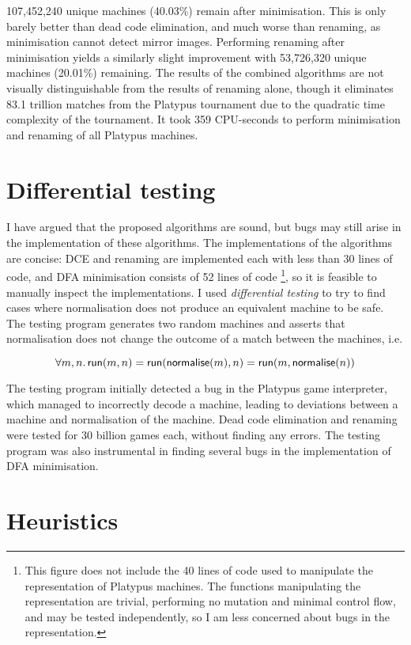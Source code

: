 107,452,240 unique machines (40.03\%) remain after minimisation.
This is only barely better than dead code elimination, and much
worse than renaming, as minimisation cannot detect mirror images.
Performing renaming after minimisation yields a similarly slight
improvement with 53,726,320 unique machines (20.01\%) remaining. The
results of the combined algorithms are not visually distinguishable from
the results of renaming alone, though it eliminates 83.1 trillion matches
from the Platypus tournament due to the quadratic time complexity of
the tournament. It took 359 CPU-seconds to perform minimisation and
renaming of all Platypus machines.

\section{Differential testing}

I have argued that the proposed algorithms are sound, but bugs may still arise
in the implementation of these algorithms. The implementations of the
algorithms are concise: DCE and renaming are implemented each with
less than 30 lines of code, and DFA minimisation consists of 52 lines of code%
\footnote{This figure does not include the 40 lines of code used to manipulate
  the representation of Platypus machines. The functions manipulating the
  representation are trivial, performing no mutation and minimal
  control flow, and may be tested independently, so I am less concerned about
  bugs in the representation.}, so it is feasible to manually inspect the
implementations. I used \emph{differential testing} to try to find cases where
normalisation does not produce an equivalent machine to be safe. The testing
program generates two random machines and asserts that normalisation
does not change the outcome of a match between the machines, i.e.

$$\forall m, n\ldotp \mathsf{run}(m, n) = \mathsf{run}(\mathsf{normalise}(m), n) = \mathsf{run}(m, \mathsf{normalise}(n))$$

The testing program initially detected a bug in the Platypus game interpreter,
which managed to incorrectly decode a machine, leading to deviations
between a machine and normalisation of the machine. Dead code elimination
and renaming were tested for 30 billion games each, without finding any errors.
The testing program was also instrumental in finding several bugs in the
implementation of DFA minimisation.

\section{Heuristics}

